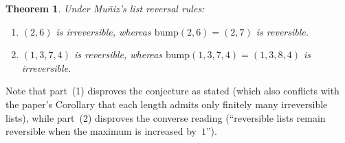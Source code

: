 \documentclass[11pt]{article}
\newtheorem{theorem}{Theorem}
\begin{document}
\begin{theorem}\label{thm:main}
Under Mu\~{n}iz's list reversal rules:
\begin{enumerate}
  \item $(2, 6)$ is irreversible, whereas $\mathrm{bump}(2, 6) = (2, 7)$ is reversible.
  \item $(1, 3, 7, 4)$ is reversible, whereas $\mathrm{bump}(1, 3, 7, 4) = (1, 3, 8, 4)$ is irreversible.
\end{enumerate}
\end{theorem}

Note that part~(1) disproves the conjecture as stated (which also conflicts with the paper's Corollary that each length admits only finitely many irreversible lists), while part~(2) disproves the converse reading (``reversible lists remain reversible when the maximum is increased by~$1$'').
\end{document}
